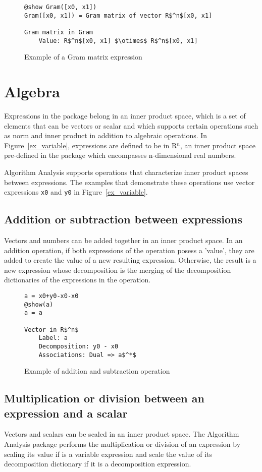 \begin{figure}[h]
	\begin{lstlisting}[mathescape]
@show Gram([x0, x1])
Gram([x0, x1]) = Gram matrix of vector R$^n$[x0, x1]

Gram matrix in Gram
	Value: R$^n$[x0, x1] $\otimes$ R$^n$[x0, x1]
	\end{lstlisting}
\caption{Example of a Gram matrix expression}
\label{ex_Gram}
\end{figure}

\section{Algebra} \label{sec:algebra}
Expressions in the package belong in an inner product space, which is a set of elements that can be vectors or scalar and which supports certain operations such as norm and inner product in addition to algebraic operations. In Figure~\ref{ex_variable}, expressions are defined to be in R$^n$, an inner product space pre-defined in the package which encompasses n-dimensional real numbers.

Algorithm Analysis supports operations that characterize inner product spaces between expressions. The examples that demonstrate these operations use vector expressions \texttt{x0} and \texttt{y0} in Figure~\ref{ex_variable}.

\subsection*{Addition or subtraction between expressions}

Vectors and numbers can be added together in an inner product space. In an addition operation, if both expressions of the operation posess a 'value', they are added to create the value of a new resulting expression. Otherwise, the result is a new expression whose decomposition is the merging of the decomposition dictionaries of the expressions in the operation.
\begin{figure}[!h]
	\begin{lstlisting}[mathescape]
a = x0+y0-x0-x0
@show(a)
a = a

Vector in R$^n$
	Label: a
	Decomposition: y0 - x0
	Associations: Dual => a$^*$
	\end{lstlisting}
	\caption{Example of addition and subtraction operation}
	\label{ex_addsub}
\end{figure}

\subsection*{Multiplication or division between an expression and a scalar} 
Vectors and scalars can be scaled in an inner product space. The Algorithm Analysis package performs the multiplication or division of an expression by scaling its value if is a variable expression and scale the value of its decomposition dictionary if it is a decomposition expression.

